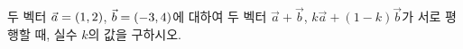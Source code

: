 두 벡터 $\vec{a}=(1{,}\mkern3mu\mathopen{}2)$, $\vec{b}=(-3{,}\mkern3mu\mathopen{}4)$에 대하여 두 벡터 $\vec{a}+\vec{b}$, $k\vec{a}+(1-k)\vec{b}$가 서로 평행할 때, 실수 $k$의 값을 구하시오.
